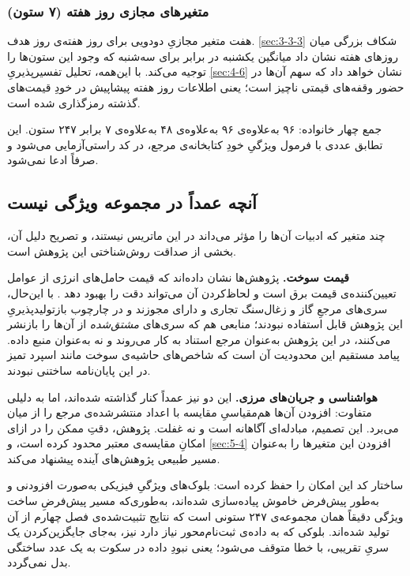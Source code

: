 \subsubsection*{متغیرهای مجازی روز هفته (۷ ستون)}

هفت متغیر مجازیِ دودویی برای روز هفته‌ی روز هدف. \cref{sec:3-3-3} شکاف بزرگی میان روزهای
هفته نشان داد  میانگین یکشنبه  در برابر  برای سه‌شنبه
 که وجود این ستون‌ها را توجیه می‌کند. با این‌همه، تحلیل تفسیرپذیریِ \cref{sec:4-6}
نشان خواهد داد که سهم آن‌ها در حضور وقفه‌های قیمتی ناچیز است؛ یعنی اطلاعات روز هفته
پیشاپیش در خودِ قیمت‌های گذشته رمزگذاری شده است.

جمع چهار خانواده: ۹۶ به‌علاوه‌ی ۹۶ به‌علاوه‌ی ۴۸ به‌علاوه‌ی ۷ برابر ۲۴۷ ستون. این تطابق
عددی با فرمول ویژگیِ خودِ کتابخانه‌ی مرجع، در کد راستی‌آزمایی می‌شود و صرفاً ادعا
نمی‌شود.

\subsection*{آنچه عمداً در مجموعه ویژگی نیست}

چند متغیر که ادبیات آن‌ها را مؤثر می‌داند در این ماتریس نیستند، و تصریح دلیل آن،
بخشی از صداقت روش‌شناختی این پژوهش است.

\textbf{قیمت سوخت.} پژوهش‌ها نشان داده‌اند که قیمت حامل‌های انرژی از عوامل تعیین‌کننده‌ی
قیمت برق است و لحاظ‌کردن آن می‌تواند دقت را بهبود دهد
\cite{chai_forecasting_2024, trebbien_explainable_2023}. با این‌حال، سری‌های مرجعِ
گاز و زغال‌سنگ تجاری و دارای مجوزند و در چارچوب بازتولیدپذیریِ این پژوهش قابل
استفاده نبودند؛ منابعی هم که سری‌های \emph{مشتق‌شده} از آن‌ها را بازنشر می‌کنند، در
این پژوهش به‌عنوان مرجع استناد به کار می‌روند و نه به‌عنوان منبع داده. پیامد مستقیم
این محدودیت آن است که شاخص‌های حاشیه‌ی سوخت  مانند اسپرد تمیز  در این
پایان‌نامه ساختنی نبودند.

\textbf{هواشناسی و جریان‌های مرزی.} این دو نیز عمداً کنار گذاشته شده‌اند، اما به دلیلی
متفاوت: افزودن آن‌ها هم‌مقیاسیِ مقایسه با اعداد منتشرشده‌ی مرجع را از میان می‌برد. این
تصمیم، مبادله‌ای آگاهانه است و نه غفلت. پژوهش، دقتِ ممکن را در ازای امکانِ مقایسه‌ی
معتبر محدود کرده است، و \cref{sec:5-4} افزودن این متغیرها را به‌عنوان مسیر طبیعی پژوهش‌های
آینده پیشنهاد می‌کند.

ساختار کد این امکان را حفظ کرده است: بلوک‌های ویژگیِ فیزیکی به‌صورت افزودنی و
به‌طور پیش‌فرض خاموش پیاده‌سازی شده‌اند، به‌طوری‌که مسیر پیش‌فرضِ ساخت ویژگی دقیقاً
همان مجموعه‌ی ۲۴۷ ستونی است که نتایج تثبیت‌شده‌ی فصل چهارم از آن تولید شده‌اند. بلوکی که
به داده‌ی ثبت‌نام‌محور نیاز دارد نیز، به‌جای جایگزین‌کردن یک سریِ تقریبی، با خطا متوقف
می‌شود؛ یعنی نبودِ داده در سکوت به یک عدد ساختگی بدل نمی‌گردد.

